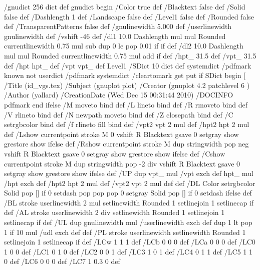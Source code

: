 /gnudict 256 dict def
gnudict begin
%
%
/Color true def
/Blacktext false def
/Solid false def
/Dashlength 1 def
/Landscape false def
/Level1 false def
/Rounded false def
/TransparentPatterns false def
/gnulinewidth 5.000 def
/userlinewidth gnulinewidth def
%
/vshift -46 def
/dl1 {
  10.0 Dashlength mul mul
  Rounded { currentlinewidth 0.75 mul sub dup 0 le { pop 0.01 } if } if
} def
/dl2 {
  10.0 Dashlength mul mul
  Rounded { currentlinewidth 0.75 mul add } if
} def
/hpt_ 31.5 def
/vpt_ 31.5 def
/hpt hpt_ def
/vpt vpt_ def
Level1 {} {
/SDict 10 dict def
systemdict /pdfmark known not {
  userdict /pdfmark systemdict /cleartomark get put
} if
SDict begin [
  /Title (id_vgs.tex)
  /Subject (gnuplot plot)
  /Creator (gnuplot 4.2 patchlevel 6 )
  /Author (yallard)
  /CreationDate (Wed Dec 15 00:31:44 2010)
  /DOCINFO pdfmark
end
} ifelse
%
%
/M {moveto} bind def
/L {lineto} bind def
/R {rmoveto} bind def
/V {rlineto} bind def
/N {newpath moveto} bind def
/Z {closepath} bind def
/C {setrgbcolor} bind def
/f {rlineto fill} bind def
/vpt2 vpt 2 mul def
/hpt2 hpt 2 mul def
/Lshow {currentpoint stroke M 0 vshift R 
	Blacktext {gsave 0 setgray show grestore} {show} ifelse} def
/Rshow {currentpoint stroke M dup stringwidth pop neg vshift R
	Blacktext {gsave 0 setgray show grestore} {show} ifelse} def
/Cshow {currentpoint stroke M dup stringwidth pop -2 div vshift R 
	Blacktext {gsave 0 setgray show grestore} {show} ifelse} def
/UP {dup vpt_ mul /vpt exch def hpt_ mul /hpt exch def
  /hpt2 hpt 2 mul def /vpt2 vpt 2 mul def} def
/DL {Color {setrgbcolor Solid {pop []} if 0 setdash}
 {pop pop pop 0 setgray Solid {pop []} if 0 setdash} ifelse} def
/BL {stroke userlinewidth 2 mul setlinewidth
	Rounded {1 setlinejoin 1 setlinecap} if} def
/AL {stroke userlinewidth 2 div setlinewidth
	Rounded {1 setlinejoin 1 setlinecap} if} def
/UL {dup gnulinewidth mul /userlinewidth exch def
	dup 1 lt {pop 1} if 10 mul /udl exch def} def
/PL {stroke userlinewidth setlinewidth
	Rounded {1 setlinejoin 1 setlinecap} if} def
/LCw {1 1 1} def
/LCb {0 0 0} def
/LCa {0 0 0} def
/LC0 {1 0 0} def
/LC1 {0 1 0} def
/LC2 {0 0 1} def
/LC3 {1 0 1} def
/LC4 {0 1 1} def
/LC5 {1 1 0} def
/LC6 {0 0 0} def
/LC7 {1 0.3 0} def
